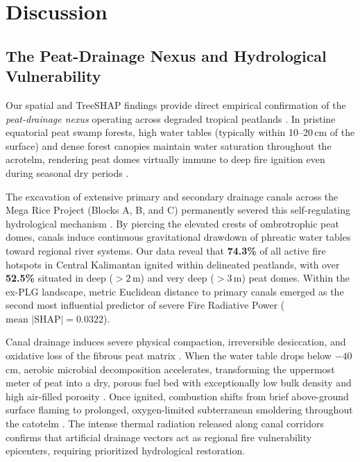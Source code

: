 \section{Discussion}
\label{sec:discussion}

\subsection{The Peat-Drainage Nexus and Hydrological Vulnerability}
\label{subsec:disc_nexus}

Our spatial and TreeSHAP findings provide direct empirical confirmation of the \textit{peat-drainage nexus} operating across degraded tropical peatlands \citep{Hooijer2012Biogeosciences, Ritzema2014HESS}. In pristine equatorial peat swamp forests, high water tables (typically within 10--20\,cm of the surface) and dense forest canopies maintain water saturation throughout the acrotelm, rendering peat domes virtually immune to deep fire ignition even during seasonal dry periods \citep{Wosten2008Geoderma, Dadap2021NatComm}. 

The excavation of extensive primary and secondary drainage canals across the Mega Rice Project (Blocks A, B, and C) permanently severed this self-regulating hydrological mechanism \citep{Silvius2005Wetlands, Ritzema2014HESS}. By piercing the elevated crests of ombrotrophic peat domes, canals induce continuous gravitational drawdown of phreatic water tables toward regional river systems. Our data reveal that \textbf{74.3\%} of all active fire hotspots in Central Kalimantan ignited within delineated peatlands, with over \textbf{52.5\%} situated in deep ($>2$\,m) and very deep ($>3$\,m) peat domes. Within the ex-PLG landscape, metric Euclidean distance to primary canals emerged as the second most influential predictor of severe Fire Radiative Power ($\text{mean } |\text{SHAP}| = 0.0322$).

Canal drainage induces severe physical compaction, irreversible desiccation, and oxidative loss of the fibrous peat matrix \citep{Hooijer2012Biogeosciences, Graham2022SciRep}. When the water table drops below $-40$\,cm, aerobic microbial decomposition accelerates, transforming the uppermost meter of peat into a dry, porous fuel bed with exceptionally low bulk density and high air-filled porosity \citep{Usup2004Tropics}. Once ignited, combustion shifts from brief above-ground surface flaming to prolonged, oxygen-limited subterranean smoldering throughout the catotelm \citep{Wooster2018NatGeosci, Vetrita2020RemoteSensing}. The intense thermal radiation released along canal corridors confirms that artificial drainage vectors act as regional fire vulnerability epicenters, requiring prioritized hydrological restoration.

